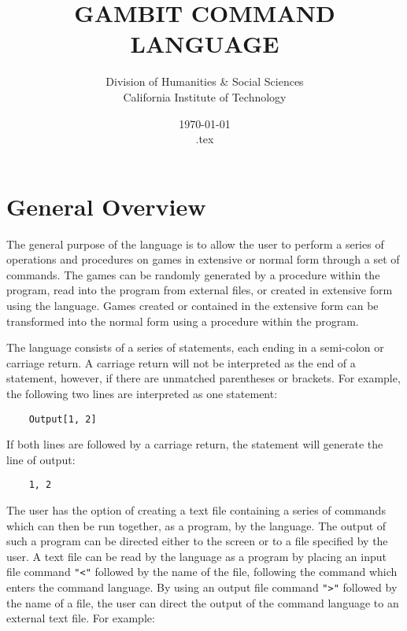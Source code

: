 \renewcommand{\baselinestretch}{.9}
\newcommand{\bd}{\begin{description}}
\newcommand{\ed}{\end{description}}


\title{GAMBIT COMMAND LANGUAGE}

\author{Division of Humanities \& Social Sciences\\
California Institute of Technology}

\date{\today\\ \jobname.tex}

\maketitle

\section*{General Overview}

The general purpose of the language is to allow the user to perform a series of
operations and procedures on games in extensive or normal form through a set of
commands.  The games can be randomly generated by a procedure within the
program, read into the program from external files, or created in extensive
form using the language.  Games created or contained in the extensive form can
be transformed into the normal form using a procedure within the program.

The language consists of a series of statements, each ending in a semi-colon
or carriage return.  A carriage return will not be interpreted as the end of a
statement, however, if there are unmatched parentheses or brackets.  For
example, the following two lines are interpreted as one statement:

\begin{verbatim}
	Output[1, 2]
\end{verbatim}

If both lines are followed by a carriage return, the statement will generate
the line of output: 

\begin{verbatim}
	1, 2
\end{verbatim}

The user has the option of creating a text file containing a series of commands
which can then be run together, as a program, by the language.  The output of 
such a program can be directed either to the screen or to a file specified by 
the user.  A text file can be read by the language as a program by placing an 
input file command {\tt "<"} followed by the name of the file, following the 
command which enters the command language.  By using an output file command 
{\tt ">"} followed by the name of a file, the user can direct the output of 
the command language to an external text file.  For example:

